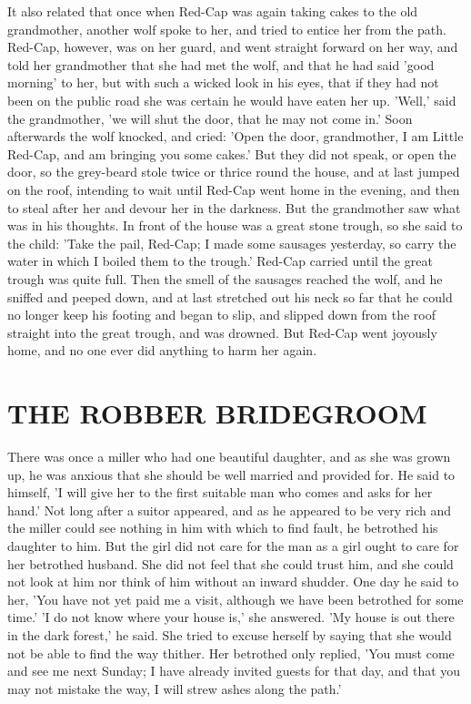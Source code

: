 \documentclass[12pt]{book}
\begin{document}
It also related that once when Red-Cap was again taking cakes to the
old grandmother, another wolf spoke to her, and tried to entice her
from the path. Red-Cap, however, was on her guard, and went straight
forward on her way, and told her grandmother that she had met the
wolf, and that he had said 'good morning' to her, but with such a
wicked look in his eyes, that if they had not been on the public road
she was certain he would have eaten her up. 'Well,' said the
grandmother, 'we will shut the door, that he may not come in.' Soon
afterwards the wolf knocked, and cried: 'Open the door, grandmother, I
am Little Red-Cap, and am bringing you some cakes.' But they did not
speak, or open the door, so the grey-beard stole twice or thrice round
the house, and at last jumped on the roof, intending to wait until
Red-Cap went home in the evening, and then to steal after her and
devour her in the darkness. But the grandmother saw what was in his
thoughts. In front of the house was a great stone trough, so she said
to the child: 'Take the pail, Red-Cap; I made some sausages yesterday,
so carry the water in which I boiled them to the trough.' Red-Cap
carried until the great trough was quite full. Then the smell of the
sausages reached the wolf, and he sniffed and peeped down, and at last
stretched out his neck so far that he could no longer keep his footing
and began to slip, and slipped down from the roof straight into the
great trough, and was drowned. But Red-Cap went joyously home, and no
one ever did anything to harm her again.



\chapter{THE ROBBER BRIDEGROOM}

There was once a miller who had one beautiful daughter, and as she was
grown up, he was anxious that she should be well married and provided
for. He said to himself, 'I will give her to the first suitable man
who comes and asks for her hand.' Not long after a suitor appeared,
and as he appeared to be very rich and the miller could see nothing in
him with which to find fault, he betrothed his daughter to him. But
the girl did not care for the man as a girl ought to care for her
betrothed husband. She did not feel that she could trust him, and she
could not look at him nor think of him without an inward shudder. One
day he said to her, 'You have not yet paid me a visit, although we
have been betrothed for some time.' 'I do not know where your house
is,' she answered. 'My house is out there in the dark forest,' he
said. She tried to excuse herself by saying that she would not be able
to find the way thither. Her betrothed only replied, 'You must come
and see me next Sunday; I have already invited guests for that day,
and that you may not mistake the way, I will strew ashes along the
path.'
\end{document}
